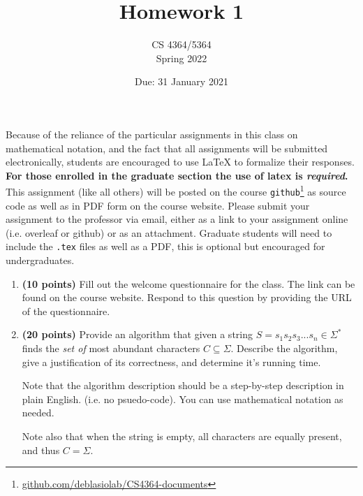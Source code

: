 \documentclass[11pt, oneside]{article}   	%
\title{Homework 1}
\author{CS 4364/5364\\Spring 2022}
\date{Due: 31 January 2021}							%
\begin{document}
\maketitle

Because of the reliance of the particular assignments in this class on mathematical notation, 
and the fact that all assignments will be submitted electronically, 
students are encouraged to use \LaTeX{} to formalize their responses. 
\textbf{For those enrolled in the graduate section the use of latex is \emph{required}.}
This assignment (like all others) will be posted on the course \texttt{github}\footnote{\url{github.com/deblasiolab/CS4364-documents}} as source code as well as in PDF form on the course website. 
Please submit your assignment to the professor via email, either as a link to your assignment online (i.e. overleaf or github) or as an attachment. 
Graduate students will need to include the \texttt{.tex} files as well as a PDF, this is optional but encouraged for undergraduates. 

\begin{enumerate}
\item \textbf{(10 points)} 
Fill out the welcome questionnaire for the class. 
The link can be found on the course website. 
Respond to this question by providing the URL of the questionnaire.


\item \textbf{(20 points)} 
Provide an algorithm that given a string $S=s_1s_2s_3...s_n \in \Sigma^*$ finds the \emph{set of} most abundant characters $C\subseteq\Sigma$. 
Describe the algorithm, give a justification of its correctness, and determine it's running time.

Note that the algorithm description should be a step-by-step description in plain English. (i.e. no psuedo-code). 
You can use mathematical notation as needed.  

Note also that when the string is empty, all characters are equally present, and thus $C = \Sigma$. 
\end{enumerate}
\end{document}
